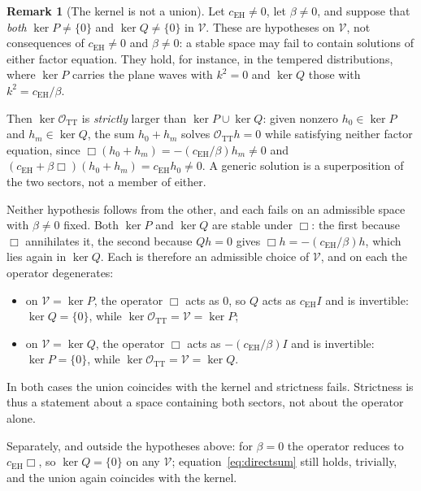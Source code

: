 \documentclass[12pt,a4paper]{article}
\theoremstyle{definition}
\newtheorem{remark}[theorem]{Remark}
\newcommand{\cEH}{c_{\mathrm{EH}}}
\newcommand{\OTT}{\mathcal{O}_{\mathrm{TT}}}
\begin{document}
    \begin{remark}[The kernel is not a union]
      \label{rem:not-union}
      Let $\cEH \neq 0$, let $\beta \neq 0$, and suppose that \emph{both} $\ker P \neq \{0\}$ and
      $\ker Q \neq \{0\}$ in $\mathcal{V}$. These are hypotheses on $\mathcal{V}$, not consequences of
      $\cEH \neq 0$ and $\beta \neq 0$: a stable space may fail to contain solutions of either factor equation.
      They hold, for instance, in the tempered distributions, where $\ker P$ carries the plane waves with
      $k^2 = 0$ and $\ker Q$ those with $k^2 = \cEH/\beta$.

      Then $\ker\OTT$ is \emph{strictly} larger than $\ker P \cup \ker Q$: given nonzero $h_0 \in \ker P$ and
      $h_m \in \ker Q$, the sum $h_0 + h_m$ solves $\OTT h = 0$ while satisfying neither factor equation, since
      $\Box(h_0+h_m) = -(\cEH/\beta)h_m \neq 0$ and $(\cEH + \beta\Box)(h_0+h_m) = \cEH h_0 \neq 0$.
      A generic solution is a superposition of the two sectors, not a member of either.

      Neither hypothesis follows from the other, and each fails on an admissible space with $\beta \neq 0$ fixed.
      Both $\ker P$ and $\ker Q$ are stable under $\Box$: the first because $\Box$ annihilates it, the second
      because $Qh = 0$ gives $\Box h = -(\cEH/\beta)h$, which lies again in $\ker Q$. Each is therefore an
      admissible choice of $\mathcal{V}$, and on each the operator degenerates:
      \begin{itemize}[nosep]
        \item on $\mathcal{V} = \ker P$, the operator $\Box$ acts as $0$, so $Q$ acts as $\cEH I$ and is
              invertible: $\ker Q = \{0\}$, while $\ker\OTT = \mathcal{V} = \ker P$;
        \item on $\mathcal{V} = \ker Q$, the operator $\Box$ acts as $-(\cEH/\beta)I$ and is invertible:
              $\ker P = \{0\}$, while $\ker\OTT = \mathcal{V} = \ker Q$.
      \end{itemize}
      In both cases the union coincides with the kernel and strictness fails. Strictness is thus a statement about
      a space containing both sectors, not about the operator alone.

      Separately, and outside the hypotheses above: for $\beta = 0$ the operator reduces to $\cEH\Box$, so
      $\ker Q = \{0\}$ on any $\mathcal{V}$; equation~\eqref{eq:directsum} still holds, trivially, and the union
      again coincides with the kernel.
    \end{remark}
\end{document}

